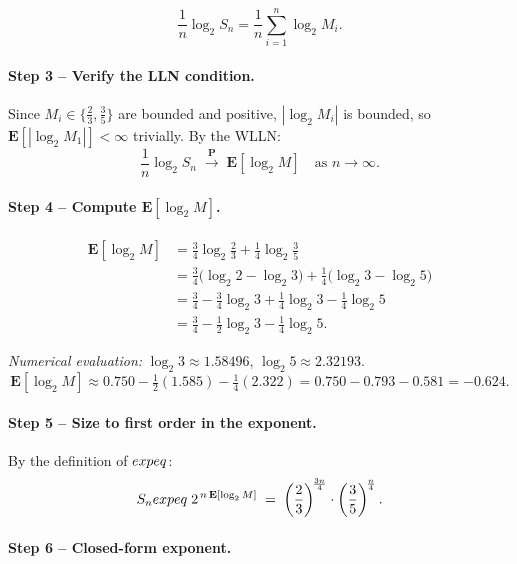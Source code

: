 \documentclass[12pt,a4paper]{article}
\theoremstyle{plain}
\theoremstyle{definition}
\theoremstyle{remark}
\newcommand{\EE}{\mathbf{E}}
\newcommand{\PP}{\mathbf{P}}
\newcommand{\expeq}{\;\dot{=}\;}       %
\begin{document}
\[
  \frac{1}{n}\log_2 S_n
    = \frac{1}{n}\sum_{i=1}^{n}\log_2 M_i.
\]

\paragraph{Step 3 – Verify the LLN condition.}

Since $M_i\in\{\tfrac{2}{3},\tfrac{3}{5}\}$ are bounded and positive,
$|\log_2 M_i|$ is bounded, so $\EE[|\log_2 M_1|]<\infty$ trivially.
By the WLLN:
\[
  \frac{1}{n}\log_2 S_n \;\xrightarrow{\;\PP\;}\; \EE[\log_2 M]
  \quad\text{as }n\to\infty.
\]

\paragraph{Step 4 – Compute $\EE[\log_2 M]$.}

\begin{align*}
  \EE[\log_2 M]
    &= \frac{3}{4}\log_2\!\frac{2}{3} + \frac{1}{4}\log_2\!\frac{3}{5}\\[4pt]
    &= \frac{3}{4}\bigl(\log_2 2 - \log_2 3\bigr)
       +\frac{1}{4}\bigl(\log_2 3 - \log_2 5\bigr)\\[4pt]
    &= \frac{3}{4} - \frac{3}{4}\log_2 3
       + \frac{1}{4}\log_2 3 - \frac{1}{4}\log_2 5\\[4pt]
    &= \frac{3}{4} - \frac{1}{2}\log_2 3 - \frac{1}{4}\log_2 5.
\end{align*}

\noindent\textit{Numerical evaluation:}
$\log_2 3 \approx 1.58496$,\; $\log_2 5 \approx 2.32193$.
\[
  \EE[\log_2 M]
    \approx 0.750 - \tfrac{1}{2}(1.585) - \tfrac{1}{4}(2.322)
    = 0.750 - 0.793 - 0.581
    = -0.624.
\]

\paragraph{Step 5 – Size to first order in the exponent.}

By the definition of $\\expeq$:
\[
  S_n
    \;\\expeq\;
    2^{\,n\,\EE[\log_2 M]}
    \;=\;
    \left(\frac{2}{3}\right)^{\!\frac{3n}{4}}
    \cdot
    \left(\frac{3}{5}\right)^{\!\frac{n}{4}}.
\]

\paragraph{Step 6 – Closed-form exponent.}
\end{document}
